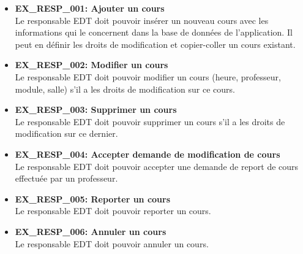 \documentclass[a4paper,12pt]{article}
\begin{document}
\begin{itemize}
    \item \textbf{EX\_RESP\_001: Ajouter un cours} \\
    Le responsable EDT doit pouvoir insérer un nouveau cours avec les informations qui le concernent dans la base de données de l'application. Il peut en définir les droits de modification et copier-coller un cours existant.

    \item \textbf{EX\_RESP\_002: Modifier un cours} \\
    Le responsable EDT doit pouvoir modifier un cours (heure, professeur, module, salle) s'il a les droits de modification sur ce cours.

    \item \textbf{EX\_RESP\_003: Supprimer un cours} \\
    Le responsable EDT doit pouvoir supprimer un cours s'il a les droits de modification sur ce dernier.

    \item \textbf{EX\_RESP\_004: Accepter demande de modification de cours} \\
    Le responsable EDT doit pouvoir accepter une demande de report de cours effectuée par un professeur.

    \item \textbf{EX\_RESP\_005: Reporter un cours} \\
    Le responsable EDT doit pouvoir reporter un cours.

    \item \textbf{EX\_RESP\_006: Annuler un cours} \\
    Le responsable EDT doit pouvoir annuler un cours.
\end{itemize}
\end{document}
